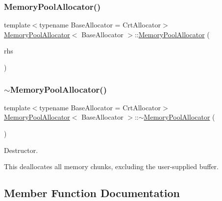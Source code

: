 \subsubsection{\texorpdfstring{Memory\+Pool\+Allocator()}{MemoryPoolAllocator()}\hspace{0.1cm}{\footnotesize\ttfamily [3/3]}}
{\footnotesize\ttfamily template$<$typename Base\+Allocator = Crt\+Allocator$>$ \\
\hyperlink{classMemoryPoolAllocator}{Memory\+Pool\+Allocator}$<$ Base\+Allocator $>$\+::\hyperlink{classMemoryPoolAllocator}{Memory\+Pool\+Allocator} (\begin{DoxyParamCaption}\item[{const \hyperlink{classMemoryPoolAllocator}{Memory\+Pool\+Allocator}$<$ Base\+Allocator $>$ \&}]{rhs }\end{DoxyParamCaption})\hspace{0.3cm}{\ttfamily [inline]}}

\mbox{\label{classMemoryPoolAllocator_aff48c4c1fa43bdd3a2b406231f0eb00e}} 
\subsubsection{\texorpdfstring{$\sim$\+Memory\+Pool\+Allocator()}{~MemoryPoolAllocator()}}
{\footnotesize\ttfamily template$<$typename Base\+Allocator = Crt\+Allocator$>$ \\
\hyperlink{classMemoryPoolAllocator}{Memory\+Pool\+Allocator}$<$ Base\+Allocator $>$\+::$\sim$\hyperlink{classMemoryPoolAllocator}{Memory\+Pool\+Allocator} (\begin{DoxyParamCaption}{ }\end{DoxyParamCaption})\hspace{0.3cm}{\ttfamily [inline]}}



Destructor. 

This deallocates all memory chunks, excluding the user-\/supplied buffer. 

\subsection{Member Function Documentation}
\mbox{\label{classMemoryPoolAllocator_a41bebe49979dc69921519c7556af18fc}} 
